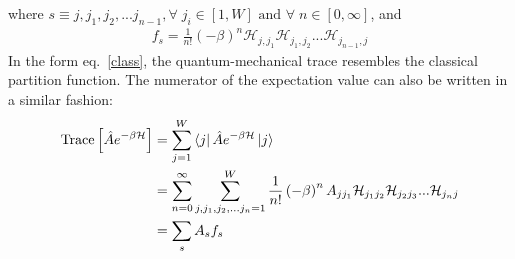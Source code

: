 \documentclass{article}
\numberwithin{equation}{section}
\begin{document}
where \(s\equiv j,j_1,j_2,...j_{n-1}, \forall\;j_i \in \left[ 1, W \right] \text{ and } \forall\;n \in \left[ 0, \infty \right] \), and 
\begin{equation}\begin{aligned}
	f_s = \frac{1}{n!} \left( -\beta \right)^n\mathcal{H}_{j,j_1}\mathcal{H}_{j_1,j_2}...\mathcal{H}_{j_{n-1},j}
\end{aligned}\end{equation}
In the form eq.~\ref{class}, the quantum-mechanical trace resembles the classical partition function. The numerator of the expectation value can also be written in a similar fashion:
\begin{equation}\begin{aligned}
	\text{Trace}\left[\hat A e^{-\beta \mathcal{H}}\right] &= \sum_{j=1}^W \bra{j} \hat A e^{-\beta \mathcal{H}}\ket{j}\\
							       &= \sum_{n=0}^\infty\sum_{j,j_1,j_2,...j_{n}=1}^W \frac{1}{n!} \left( -\beta \right)^n A_{jj_1}\mathcal{H}_{j_1 j_2}\mathcal{H}_{j_2j_3}...\mathcal{H}_{j_{n}j}\\
							       &= \sum_{s} A_{s}f_s\\
\end{aligned}\end{equation}
\end{document}
